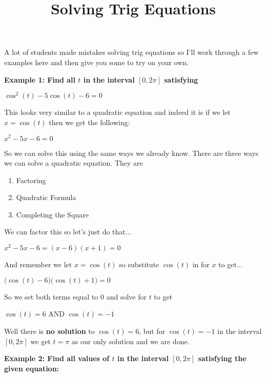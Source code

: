 \documentclass[12pt]{article}
\begin{document}
\title{Solving Trig Equations}
\date{}
\author{}
\maketitle
A lot of students made mistakes solving trig equations so I'll work through a few examples here and then give you some to try on your own.

\textbf{Example 1: Find all $t$ in the interval $[0, 2\pi]$ satisfying}
\newline

\centerline{$\cos^{2}(t) -5\cos(t) - 6 = 0$} 

This looks very similar to a quadratic equation and indeed it is if we let $x = \cos(t)$ then we get the following:
\newline

\centerline{$x^2 - 5x - 6=0$}

So we can solve this using the same ways we already know. There are three ways we can solve a quadratic equation. They are

\begin{enumerate}
\item Factoring
\item Quadratic Formula
\item Completing the Square
\end{enumerate}

We can factor this so let's just do that...
\newline

\centerline{$x^2 - 5x - 6 = (x-6)(x+1) = 0$}

And remember we let $x = \cos(t)$ so substitute $\cos(t)$ in for $x$ to get...
\newline

\centerline{$\Big(\cos(t) - 6\Big)\Big(\cos(t) +1\Big) = 0$}

So we set both terms equal to $0$ and solve for $t$ to get
\newline

\centerline{$\cos(t) = 6$\hspace{1cm} AND \hspace{1cm}$\cos(t) = -1$}

Well there is \textbf{no solution} to $\cos(t) = 6$, but for $\cos(t) = -1$ in the interval $[0, 2\pi]$ we get $t = \pi$ as our only solution and we are done.

\textbf{Example 2: Find all values of $t$ in the interval $[0, 2\pi]$ satisfying the given equation:}
\newline
\end{document}
